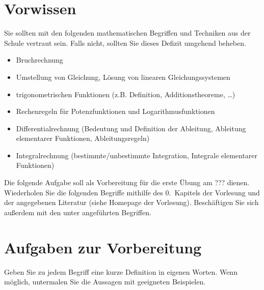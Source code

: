 \documentclass[11pt]{scrartcl}
\begin{document}
\section*{Vorwissen}
Sie sollten mit den folgenden mathematischen Begriffen und Techniken aus der Schule vertraut sein. Falls nicht, sollten Sie dieses Defizit umgehend beheben.
\begin{itemize}
  \item Bruchrechnung
  \item Umstellung von Gleichung, Lösung von linearen Gleichungssystemen
  \item trigonometrischen Funktionen (z.B. Definition, Additionstheoreme, \ldots)
  \item Rechenregeln für Potenzfunktionen und Logarithmusfunktionen
  \item Differentialrechnung (Bedeutung und Definition der Ableitung, Ableitung elementarer Funktionen, Ableitungsregeln)
  \item Integralrechnung (bestimmte/unbestimmte Integration, Integrale elementarer Funktionen)
\end{itemize}
\vspace{1em}

Die folgende Aufgabe soll als Vorbereitung für die erste Übung am ??? dienen.
Wiederholen Sie die folgenden Begriffe mithilfe des 0.\ Kapitels der Vorlesung und der angegebenen Literatur (siehe Homepage der Vorlesung).
Beschäftigen Sie sich außerdem mit den unter  angeführten Begriffen.

\section*{Aufgaben zur Vorbereitung}
Geben Sie zu jedem Begriff eine kurze Definition in eigenen Worten.
Wenn möglich, untermalen Sie die Aussagen mit geeigneten Beispielen.
\end{document}
